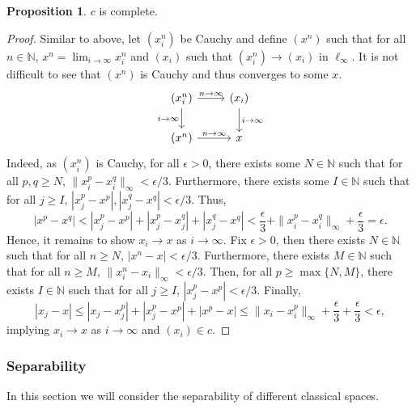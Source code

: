 \documentclass[]{article}
\theoremstyle{definition}
\theoremstyle{definition}
\newtheorem{proposition}{Proposition}[section]
\begin{document}
\begin{proposition}
  \(c\) is complete.
\end{proposition}
\begin{proof}
  Similar to above, let \((x_i^n)\) be Cauchy and define \((x^n)\) such that for 
  all \(n \in \mathbb{N}\), \(x^n = \lim_{i \to \infty} x_i^n\) and  
  \((x_i)\) such that \((x_i^n) \to (x_i)\) in \(\ell_\infty\). It is not 
  difficult to see that \((x^n)\) is Cauchy and thus converges to some \(x\).
  \[\begin{tikzcd}
    (x_i^n) \arrow{r}{n \to \infty} 
    \arrow[swap]{d}{i \to \infty} & (x_i) \arrow{d}{i \to \infty} \\
    (x^n) \arrow{r}{n \to \infty}& x
    \end{tikzcd}\]
  Indeed, as \((x_i^n)\) is Cauchy, for all \(\epsilon > 0\), there exists some 
  \(N \in \mathbb{N}\) such that for all 
  \(p, q \ge N\), \(\|x_i^p - x_i^q\|_\infty < \epsilon / 3\).
  Furthermore, there exists some \(I \in \mathbb{N}\) such that for all 
  \(j \ge I\), \(|x_j^p - x^p|, |x_j^q - x^q| < \epsilon / 3\). Thus, 
  \[|x^p - x^q| < |x_j^p - x^p| + |x_j^p - x_j^q| + |x_j^q - x^q| 
    < \frac{\epsilon}{3} + \|x_i^p - x_i^q\|_\infty + \frac{\epsilon}{3} 
    = \epsilon.\]
  Hence, it remains to show \(x_i \to x\) as \(i \to \infty\). 
  Fix \(\epsilon > 0\), then there exists \(N \in \mathbb{N}\) such that for 
  all \(n \ge N\), \(|x^n - x| < \epsilon / 3\). Furthermore, there exists 
  \(M \in \mathbb{N}\) such that for all \(n \ge M\), 
  \(\|x_i^n - x_i\|_\infty < \epsilon / 3\). Then, for all 
  \(p \ge \max\{N, M\}\), there exists \(I \in \mathbb{N}\) such that 
  for all \(j \ge I\), \(|x_j^p - x^p| < \epsilon / 3\). Finally, 
  \[|x_j - x| \le |x_j - x_j^p| + |x_j^p - x^p| + |x^p - x| \le 
    \|x_i - x_i^p\|_\infty + \frac{\epsilon}{3} + \frac{\epsilon}{3} < \epsilon,\]
  implying \(x_i \to x\) as \(i \to \infty\) and \((x_i) \in c\).
\end{proof}

\subsubsection{Separability}

In this section we will consider the separability of different classical spaces.
\end{document}
